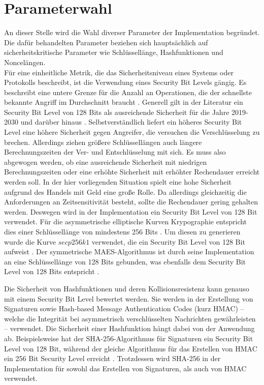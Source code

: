 \documentclass[
	fontsize=11pt,
	headings=small,
	parskip=half,           %
	bibliography=totoc,
	numbers=noenddot,       %
	open=any,               %
]{scrreprt}
\begin{document}
\section{Parameterwahl}
An dieser Stelle wird die Wahl diverser Parameter der Implementation begründet. Die dafür behandelten Parameter beziehen sich hauptsächlich auf sicherheitskritische Parameter wie Schlüssellänge, Hashfunktionen und Noncelängen.\\
Für eine einheitliche Metrik, die das Sicherheitsniveau eines Systems oder Protokolls beschreibt, ist die Verwendung eines Security Bit Levels gängig. Es beschreibt eine untere Grenze für die Anzahl an Operationen, die der schnellste bekannte Angriff im Durchschnitt braucht \cite{ecc-hankerson2021nist}. Generell gilt in der Literatur ein Security Bit Level von 128 Bits als ausreichende Sicherheit für die Jahre 2019-2030 und darüber hinaus \cite{elaine2016recommendation}. Selbstverständlich liefert ein höheres Security Bit Level eine höhere Sicherheit gegen Angreifer, die versuchen die Verschlüsselung zu brechen. Allerdings ziehen größere Schlüssellängen auch längere Berechnungszeiten der Ver- und Entschlüsselung mit sich. Es muss also abgewogen werden, ob eine ausreichende Sicherheit mit niedrigen Berechnungszeiten oder eine erhöhte Sicherheit mit erhöhter Rechendauer erreicht werden soll. In der hier vorliegenden Situation spielt eine hohe Sicherheit aufgrund des Handels mit Geld eine große Rolle. Da allerdings gleichzeitig die Anforderungen an Zeitsensitivität besteht, sollte die Rechendauer gering gehalten werden. Deswegen wird in der Implementation ein Security Bit Level von 128 Bit verwendet. Für die asymmetrische elliptische Kurven Krypographie entspricht dies einer Schlüssellänge von mindestens 256 Bits \cite{elaine2016recommendation,bsi2020cryptographic}. Um diesen zu generieren wurde die Kurve $secp256k1$ verwendet, die ein Security Bit Level von 128 Bit aufweist \cite{ecc-duka2020elliptic}. Der symmetrische MAES-Algorithmus ist durch seine Implementation an eine Schlüssellänge von 128 Bits gebunden, was ebenfalls dem Security Bit Level von 128 Bits entspricht \cite{elaine2016recommendation}.

Die Sicherheit von Hashfunktionen und deren Kollisionsresistenz kann genauso mit einem Security Bit Level bewertet werden. Sie werden in der Erstellung von Signaturen sowie Hash-based Message Authentication Codes (kurz HMAC) -- welche die Integrität bei asymmetrisch verschlüsselten Nachrichten gewährleisten -- verwendet. Die Sicherheit einer Hashfunktion hängt dabei von der Anwendung ab. Beispielsweise hat der SHA-256-Algorithmus für Signaturen ein Security Bit Level von 128 Bit, während der gleiche Algorithmus für das Erstellen von HMAC ein 256 Bit Security Level erreicht \cite{elaine2016recommendation}. Trotzdessen wird SHA-256 in der Implementation für sowohl das Erstellen von Signaturen, als auch von HMAC verwendet.
\end{document}
